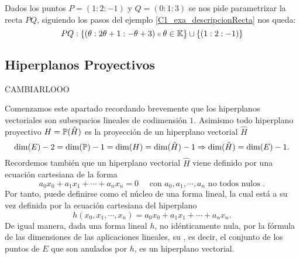\begin{exa}
	\label{C1_exa_rectaConcreta}
	Dados los puntos $P=(1:2:-1)$ y $Q=(0:1:3)$ se nos pide parametrizar la recta $PQ$, siguiendo los pasos del ejemplo \ref{C1_exa_descripcionRecta} nos queda:
	\[
	PQ:\{(\theta:2\theta+1:-\theta+3)\shortparallel\theta\in\mathbb{K}\}\cup\{(1:2:-1)\}
	\]
\end{exa}
\subsection{Hiperplanos Proyectivos}
CAMBIARLOOO

Comenzamos este apartado recordando brevemente que los hiperplanos vectoriales son subespacios lineales de codimensión $1$. Asimismo todo hiperplano proyectivo $H=\mathbb{P}(\hat{H})$ es la proyección de un hiperplano vectorial $\hat{H}$
\begin{equation}
	\dim(E)-2=\dim(\mathbb{P})-1=\dim(H)=\dim(\hat{H})-1\Rightarrow \dim(\hat{H})=\dim(E)-1.
\end{equation}
Recordemos también que un hiperplano vectorial $\hat{H}$ viene definido por una ecuación cartesiana de la forma
\begin{equation*}
	a_0x_0+a_1x_1+\cdots +a_nx_n=0 \quad \text{ con } a_0,a_1,\cdots, a_n \text{ no todos nulos }.
\end{equation*}
Por tanto, puede definirse como el núcleo de una forma lineal, la cual está a su vez definida por la ecuación cartesiana del hiperplano
\begin{equation*}
h(x_0,x_1,\cdots,x_n)=a_0x_0+a_1x_1+\cdots +a_nx_n.
\end{equation*}
De igual manera, dada una forma lineal $h$, no idénticamente nula, por la fórmula de las dimensiones de las aplicaciones lineales, su , es decir, el conjunto de los puntos de $E$ que son anulados por $h$, es un hiperplano vectorial. 

